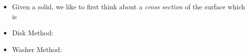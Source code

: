 \documentclass[12pt]{report}
\newcommand{\ds}{\displaystyle}
\begin{document}
\begin{itemize}

\item Given a solid, we like to first think about a \emph{cross section} of the surface which is %


\bigskip\bigskip

\item Disk Method: %



\vspace{2.5in}



\item Washer Method: %




\end{itemize}






%
%
%
%
%
%
%
%
%
%
%
%
%
%
%
%
%
%
%
%
\end{document}
